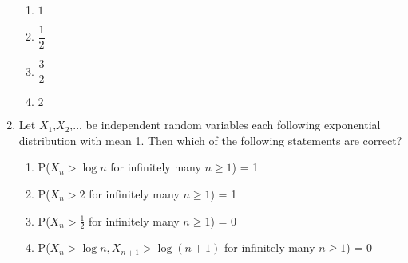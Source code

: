 \begin{enumerate}[label=\thesection.\arabic*.,ref=\thesection.\theenumi]
\begin{enumerate}[label=\Alph*)]
    \item $1$\\[0.5pt]
    \item $\dfrac{1}{2}$\\
    \item $\dfrac{3}{2}$\\
    \item $2$
\end{enumerate}
%
\solution

%
\item Let $X_1$,$X_2$,... be independent random variables each following exponential distribution with mean 1. Then which of the following statements are correct?
\begin{enumerate}
    \item P($X_n > \log n$ for infinitely many $n \geq 1$) = 1
    \item P($X_n > 2$ for infinitely many $n \geq 1$) = 1
    \item P($X_n > \frac{1}{2}$ for infinitely many $n \geq 1$) = 0
    \item P($X_n > \log n, X_{n+1}>\log (n+1)$ for infinitely many $n \geq 1$) = 0
\end{enumerate}
%
\solution


\end{enumerate}
